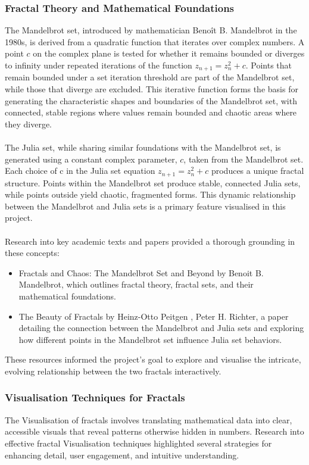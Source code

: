 \documentclass[12pt,a4paper]{report}
\begin{document}
\subsubsection{Fractal Theory and Mathematical Foundations}
The Mandelbrot set, introduced by mathematician Benoît B. Mandelbrot in the 1980s, is derived from a quadratic function that iterates over complex numbers. A point $c$ on the complex plane is tested for whether it remains bounded or diverges to infinity under repeated iterations of the function 
$z_{n+1}=z_n^2 + c$. Points that remain bounded under a set iteration threshold are part of the Mandelbrot set, while those that diverge are excluded. This iterative function forms the basis for generating the characteristic shapes and boundaries of the Mandelbrot set, with connected, stable regions where values remain bounded and chaotic areas where they diverge. 
\\\\
The Julia set, while sharing similar foundations with the Mandelbrot set, is generated using a constant complex parameter, $c$, taken from the Mandelbrot set. Each choice of c in the Julia set equation $z_{n+1}=z_n^2 + c$ produces a unique fractal structure. Points within the Mandelbrot set produce stable, connected Julia sets, while points outside yield chaotic, fragmented forms. This dynamic relationship between the Mandelbrot and Julia sets is a primary feature visualised in this project. 
\\\\
Research into key academic texts and papers provided a thorough grounding in these concepts: 

\begin{itemize}
\item Fractals and Chaos: The Mandelbrot Set and Beyond by Benoit B. Mandelbrot, which outlines fractal theory, fractal sets, and their mathematical foundations. 

\item The Beauty of Fractals by Heinz-Otto Peitgen , Peter H. Richter, a paper detailing the connection between the Mandelbrot and Julia sets and exploring how different points in the Mandelbrot set influence Julia set behaviors.
\end{itemize}

These resources informed the project’s goal to explore and visualise the intricate, evolving relationship between the two fractals interactively. 

\subsubsection{Visualisation Techniques for Fractals}
The Visualisation of fractals involves translating mathematical data into clear, accessible visuals that reveal patterns otherwise hidden in numbers. Research into effective fractal Visualisation techniques highlighted several strategies for enhancing detail, user engagement, and intuitive understanding. 
\end{document}
